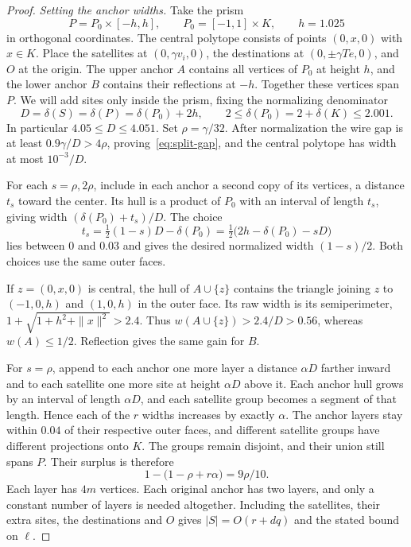 \begin{proof}
\emph{Setting the anchor widths.}
Take the prism
\[
       P=P_0\times[-h,h],\qquad P_0=[-1,1]\times K,\qquad h=1.025
\]
in orthogonal coordinates. The central polytope consists of points
\((0,x,0)\) with \(x\in K\). Place the satellites at
\((0,\gamma v_i,0)\), the destinations at \((0,\pm\gamma Te,0)\),
and \(O\) at the origin. The upper anchor \(A\) contains all vertices
of \(P_0\) at height \(h\), and the lower anchor \(B\) contains their
reflections at \(-h\). Together these vertices span \(P\). We will
add sites only inside the prism, fixing the normalizing denominator
\[
       D=\delta(S)=\delta(P)=\delta(P_0)+2h,\qquad
       2\le\delta(P_0)=2+\delta(K)\le2.001 .
\]
In particular \(4.05\le D\le4.051\). Set \(\rho=\gamma/32\).
After normalization the wire gap is at least \(0.9\gamma/D>4\rho\),
proving~\eqref{eq:split-gap}, and the central polytope has width at
most \(10^{-3}/D\).

For each \(s=\rho,2\rho\), include in each anchor a second copy of
its vertices, a distance \(t_s\) toward the center. Its hull is
a product of \(P_0\) with an interval of length \(t_s\), giving width
\((\delta(P_0)+t_s)/D\). The choice
\[
       t_s=\tfrac12(1-s)D-\delta(P_0)
           =\tfrac12\bigl(2h-\delta(P_0)-sD\bigr)
\]
lies between \(0\) and \(0.03\) and gives the desired normalized
width \((1-s)/2\). Both choices use the same outer faces.

If \(z=(0,x,0)\) is central, the hull of \(A\cup\{z\}\) contains
the triangle joining \(z\) to \((-1,0,h)\) and \((1,0,h)\) in the
outer face. Its raw width is its semiperimeter,
\(1+\sqrt{1+h^2+\|x\|^2}>2.4\). Thus \(w(A\cup\{z\})>2.4/D>0.56\),
whereas \(w(A)\le1/2\). Reflection gives the same gain for \(B\).

For \(s=\rho\), append to each anchor one more layer a distance
\(\alpha D\) farther inward and to each satellite one more site at
height \(\alpha D\) above it. Each anchor hull grows by an interval
of length \(\alpha D\), and each satellite group becomes a segment of
that length. Hence each of the \(r\) widths increases by exactly
\(\alpha\). The anchor layers stay within \(0.04\) of their respective
outer faces, and different satellite groups have different projections
onto \(K\). The groups remain disjoint, and their union still spans
\(P\). Their surplus is therefore
\[
                  1-\bigl(1-\rho+r\alpha\bigr)=9\rho/10 .
\]
Each layer has \(4m\) vertices. Each original anchor has two layers,
and only a constant number of layers is needed altogether. Including
the satellites, their extra sites, the destinations and \(O\) gives
\(|S|=O(r+dq)\) and the stated bound on \(\ell\).
\end{proof}
